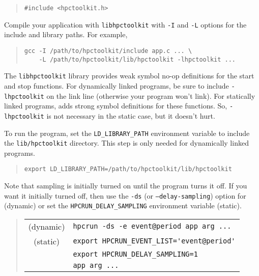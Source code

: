 \begin{quote}
\begin{verbatim}
#include <hpctoolkit.h>
\end{verbatim}
\end{quote}

Compile your application with {\tt libhpctoolkit} with {\tt -I} and
{\tt -L} options for the include and library paths.  For example,

\begin{quote}
\begin{verbatim}
gcc -I /path/to/hpctoolkit/include app.c ... \
    -L /path/to/hpctoolkit/lib/hpctoolkit -lhpctoolkit ...
\end{verbatim}
\end{quote}

The {\tt libhpctoolkit} library provides weak symbol no-op definitions
for the start and stop functions.  For dynamically linked programs, be
sure to include {\tt -lhpctoolkit} on the link line (otherwise your
program won't link).  For statically linked programs, \hpclink{} adds
strong symbol definitions for these functions.  So, {\tt -lhpctoolkit}
is not necessary in the static case, but it doesn't hurt.

To run the program, set the \verb|LD_LIBRARY_PATH| environment
variable to include the \HPCToolkit{} {\tt lib/hpctoolkit} directory.
This step is only needed for dynamically linked programs.

\begin{quote}
\begin{verbatim}
export LD_LIBRARY_PATH=/path/to/hpctoolkit/lib/hpctoolkit
\end{verbatim}
\end{quote}

Note that sampling is initially turned on until the program turns it
off.  If you want it initially turned off, then use the {\tt -ds} (or
{\tt --delay-sampling}) option for \hpcrun{} (dynamic) or set the
\verb|HPCRUN_DELAY_SAMPLING| environment variable (static).

\begin{quote}
\begin{tabular}{@{}cl}
(dynamic) & \verb|hpcrun -ds -e event@period app arg ...|  \\
(static)  & \verb|export HPCRUN_EVENT_LIST='event@period'| \\
& \verb|export HPCRUN_DELAY_SAMPLING=1| \\
& \verb|app arg ...|
\end{tabular}
\end{quote}

